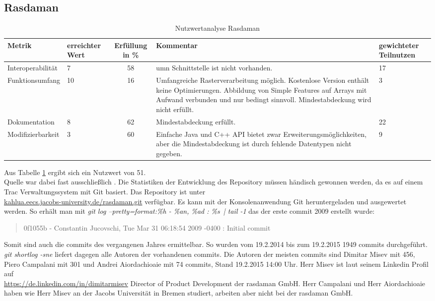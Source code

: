 \subsection{Rasdaman}
\begin{table}[h!]
\centering
\small
\begin{tabular}{l|p{1.8cm}|c|p{3.1cm}|p{1.8cm}}
\textbf{Metrik} & \textbf{erreichter Wert} & \textbf{Erfüllung in \%} & \textbf{Kommentar} & \textbf{gewichteter Teilnutzen} \\ \hline
Interoperabilität & 7 & 58 & \Gls{umn} Schnittstelle ist nicht vorhanden. & 17 \\ \hline
Funktionsumfang & 10 & 16 & Umfangreiche Rasterverarbeitung möglich. Kostenlose Version enthält keine Optimierungen. Abbildung von Simple Features auf Arrays mit Aufwand verbunden und nur bedingt sinnvoll. Mindestabdeckung wird nicht erfüllt. & 3 \\ \hline
Dokumentation & 8 & 62 & Mindestabdeckung erfüllt. & 22 \\ \hline
Modifizierbarkeit & 3 & 60 & Einfache Java und C++ API bietet zwar Erweiterungsmöglichkeiten, aber die Mindestabdeckung ist durch fehlende Datentypen nicht gegeben. & 9 \\
\end{tabular}
\caption{Nutzwertanalyse Rasdaman}
\label{table:nutzwertanalyse-rasdaman}
\end{table}
Aus Tabelle \ref{table:nutzwertanalyse-rasdaman} ergibt sich ein Nutzwert von 51.\\
Quelle war dabei fast ausschließlich \cite{website:rasdaman-features}.
Die Statistiken der Entwicklung des Repository müssen händisch gewonnen werden, da es auf einem Trac Verwaltungssystem mit Git basiert.
Das Repository ist unter\\\url{kahlua.eecs.jacobs-university.de/rasdaman.git} verfügbar.
Es kann mit der Konsolenanwendung Git heruntergeladen und ausgewertet werden.
So erhält man mit \textit{git log --pretty=format:\grqq \%h - \%an, \%ad : \%s\grqq\ | tail -1} das der erste commit 2009 erstellt wurde:
\begin{quote}
0f1055b - Constantin Jucovschi, Tue Mar 31 06:18:54 2009 -0400 : Initial commit
\end{quote}
Somit sind auch die commits des vergangenen Jahres ermittelbar.
So wurden vom 19.2.2014 bis zum 19.2.2015 1949 commits durchgeführt.
\textit{git shortlog -sne} liefert dagegen alle Autoren der vorhandenen commits.
Die Autoren der meisten commits sind Dimitar Misev mit 456, Piero Campalani mit 301 und Andrei Aiordachioaie mit 74 commits, Stand 19.2.2015 14:00 Uhr.
Herr Misev ist laut seinem Linkedin Profil auf\\\url{https://de.linkedin.com/in/dimitarmisev} Director of Product Development der \mbox{rasdaman} GmbH.
Herr Campalani und Herr Aiordachioaie haben wie Herr Misev an der Jacobs Universität in Bremen studiert, arbeiten aber nicht bei der \mbox{rasdaman} GmbH.

